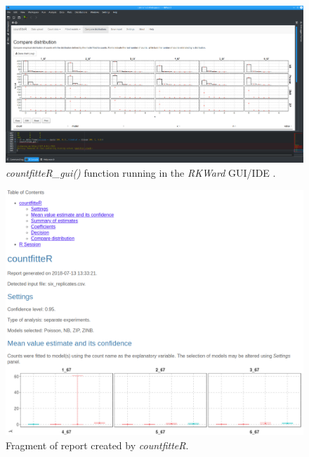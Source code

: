 \begin{figure}[htbp]
  \centering
  \includegraphics[width=0.99\columnwidth]{fig_gui}
  \caption{\emph{countfitteR\_gui()} function running in the \emph{RKWard} GUI/IDE \citep{rodiger_rkward:_2012}.}
  \label{figure:fig_gui.png}
\end{figure}

\begin{figure}[htbp]
  \centering
  \includegraphics[width=0.99\columnwidth]{cj_rep}
  \caption{Fragment of report created by \emph{countfitteR}.}
  \label{figure:cj_rep.png}
\end{figure}

% 

